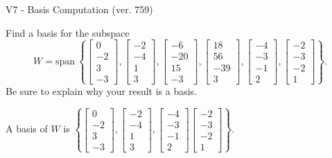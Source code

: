\begin{exercise}
  \begin{exerciseTitle}V7 - Basis Computation (ver. 759)\end{exerciseTitle}
  \begin{exerciseStatement}
    Find a basis for the subspace 
\[W=\mathrm{span}\ \left\{\left[\begin{array}{r}
0 \\
-2 \\
3 \\
-3
\end{array}\right] , \left[\begin{array}{r}
-2 \\
-4 \\
1 \\
3
\end{array}\right] , \left[\begin{array}{r}
-6 \\
-20 \\
15 \\
-3
\end{array}\right] , \left[\begin{array}{r}
18 \\
56 \\
-39 \\
3
\end{array}\right] , \left[\begin{array}{r}
-4 \\
-3 \\
-1 \\
2
\end{array}\right] , \left[\begin{array}{r}
-2 \\
-3 \\
-2 \\
1
\end{array}\right]\right\}.\]
 Be sure to explain why your result is a basis.


  \end{exerciseStatement}
  \begin{exerciseAnswer}
   A basis of \(W\) is  \(\left\{\left[\begin{array}{r}
0 \\
-2 \\
3 \\
-3
\end{array}\right] , \left[\begin{array}{r}
-2 \\
-4 \\
1 \\
3
\end{array}\right] , \left[\begin{array}{r}
-4 \\
-3 \\
-1 \\
2
\end{array}\right] \left[\begin{array}{r}
-2 \\
-3 \\
-2 \\
1
\end{array}\right]\right\}\).
  


  \end{exerciseAnswer}
\end{exercise}